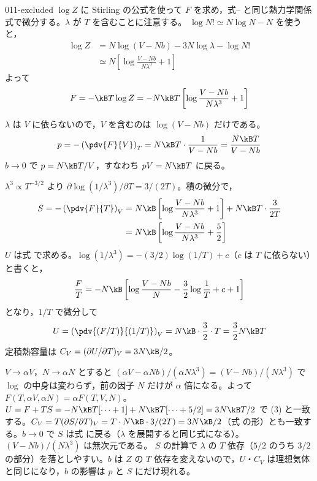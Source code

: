 \documentclass[uplatex,dvipdfmx,a4paper,11pt]{jsarticle}
\begin{document}
\begin{kaisetsu}{011-excluded}
\houshin $\log Z$ に Stirling の公式を使って $F$ を求め，式-- と同じ熱力学関係式で微分する。$\lambda$ が $T$ を含むことに注意する。
\keisan
{} $\log N!\simeq N\log N-N$ を使うと，
\begin{align*}
\log Z&=N\log(V-Nb)-3N\log\lambda-\log N!\\
&\simeq N\left[\log\frac{V-Nb}{N\lambda^{3}}+1\right]
\end{align*}
よって
\[F=-\kB T\log Z=-N\kB T\left[\log\frac{V-Nb}{N\lambda^{3}}+1\right]\]

 $\lambda$ は $V$ に依らないので，$V$ を含むのは $\log(V-Nb)$ だけである。
\[p=-\left(\pdv{F}{V}\right)_{T}=N\kB T\cdot\frac{1}{V-Nb}=\frac{N\kB T}{V-Nb}\]
$b\to0$ で $p=N\kB T/V$，すなわち $pV=N\kB T$ に戻る。

 $\lambda^{3}\propto T^{-3/2}$ より $\partial\log(1/\lambda^{3})/\partial T=3/(2T)$。積の微分で，
\begin{align*}
S=-\left(\pdv{F}{T}\right)_{V}&=N\kB\left[\log\frac{V-Nb}{N\lambda^{3}}+1\right]+N\kB T\cdot\frac{3}{2T}\\
&=N\kB\left[\log\frac{V-Nb}{N\lambda^{3}}+\frac{5}{2}\right]
\end{align*}
$U$ は式 で求める。$\log(1/\lambda^{3})=-(3/2)\log(1/T)+c$（$c$ は $T$ に依らない）と書くと，
\[\frac{F}{T}=-N\kB\left[\log\frac{V-Nb}{N}-\frac{3}{2}\log\frac{1}{T}+c+1\right]\]
となり，$1/T$ で微分して
\[U=\left(\pdv{(F/T)}{(1/T)}\right)_{V}=N\kB\cdot\frac{3}{2}\cdot T=\frac{3}{2}N\kB T\]
定積熱容量は $C_{V}=(\partial U/\partial T)_{V}=3N\kB/2$。

 $V\to\alpha V$，$N\to\alpha N$ とすると $(\alpha V-\alpha Nb)/(\alpha N\lambda^{3})=(V-Nb)/(N\lambda^{3})$ で $\log$ の中身は変わらず，前の因子 $N$ だけが $\alpha$ 倍になる。よって $F(T,\alpha V,\alpha N)=\alpha F(T,V,N)$。
\kenzan $U=F+TS=-N\kB T[\cdots+1]+N\kB T[\cdots+5/2]=3N\kB T/2$ で (3) と一致する。$C_{V}=T(\partial S/\partial T)_{V}=T\cdot N\kB\cdot3/(2T)=3N\kB/2$（式 の形）とも一致する。$b\to0$ で $S$ は式 に戻る（$\lambda$ を展開すると同じ式になる）。$(V-Nb)/(N\lambda^{3})$ は無次元である。
\tsumazuki $S$ の計算で $\lambda$ の $T$ 依存（$5/2$ のうち $3/2$ の部分）を落としやすい。$b$ は $Z$ の $T$ 依存を変えないので，$U$・$C_{V}$ は理想気体と同じになり，$b$ の影響は $p$ と $S$ にだけ現れる。
\end{kaisetsu}
\end{document}
